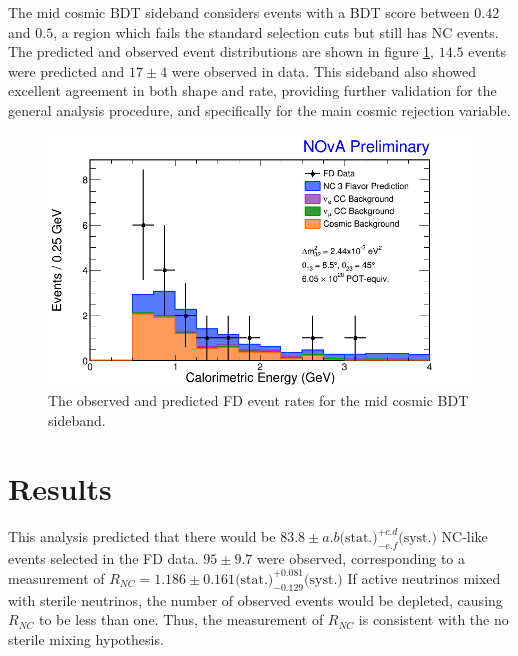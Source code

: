 The mid cosmic BDT sideband considers events with a BDT score between $0.42$ and $0.5$, a region which fails the standard selection cuts but still has NC events. The predicted and observed event distributions are shown in figure \ref{fig:SidebandMidBDT}, $14.5$ events were predicted and $17 \pm 4$ were observed in data. This sideband also showed excellent agreement in both shape and rate, providing further validation for the general analysis procedure, and specifically for the main cosmic rejection variable.
\begin{figure}[htbp]
  \centering
  \includegraphics[width=1\textwidth]{figures/Ana01Results/FDMidBDTCalEDataMCStack.png}
  \caption[Mid Cosmic BDT Sideband]{The observed and predicted FD event rates for the mid cosmic BDT sideband.}
  \label{fig:SidebandMidBDT}
\end{figure}

\section{Results}
\label{sec:ResultsFD}

This analysis predicted that there would be $83.8 \pm a.b \mbox{(stat.)} ^{+c.d}_{-e.f} \mbox{(syst.)}$ NC-like events selected in the FD data. $95 \pm 9.7$ were observed, corresponding to a measurement of $R_{NC} = 1.186 \pm 0.161 \mbox{(stat.)} ^{+0.081}_{-0.129} \mbox{(syst.)}$ If active neutrinos mixed with sterile neutrinos, the number of observed events would be depleted, causing $R_{NC}$ to be less than one. Thus, the measurement of $R_{NC}$ is consistent with the no sterile mixing hypothesis.

